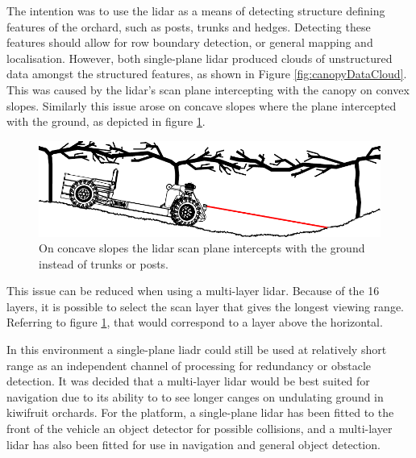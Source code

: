 \documentclass[preprint,authoryear,12pt]{elsarticle}
\begin{document}
        The intention was to use the lidar as a means of detecting structure defining features of the orchard, such as posts, trunks and hedges.
        Detecting these features should allow for row boundary detection, or general mapping and localisation.
        However, both single-plane lidar produced clouds of unstructured data amongst the structured features, as shown in Figure \ref{fig:canopyDataCloud}.
        This was caused by the lidar's scan plane intercepting with the canopy on convex slopes.
        Similarly this issue arose on concave slopes where the plane intercepted with the ground, as depicted in figure \ref{fig:concaveSlope}.

        \begin{figure}[htb]
            \centering
            \includegraphics[width=\linewidth]{imgs/concave_slope/concave_slope_v4.pdf}
            \caption{
                On concave slopes the lidar scan plane intercepts with the ground instead of trunks or posts.
            }
            \label{fig:concaveSlope}
        \end{figure}

        This issue can be reduced when using a multi-layer lidar.
        Because of the 16 layers, it is possible to select the scan layer that gives the longest viewing range.
        Referring to figure \ref{fig:concaveSlope}, that would correspond to a layer above the horizontal.

        In this environment a single-plane liadr could still be used at relatively short range as an independent channel of processing for redundancy or obstacle detection.
        It was decided that a multi-layer lidar would be best suited for navigation due to its ability to to see longer canges on undulating ground in kiwifruit orchards.
        For the platform, a single-plane lidar has been fitted to the front of the vehicle an object detector for possible collisions, and a multi-layer lidar has also been fitted for use in navigation and general object detection.

        
\end{document}
